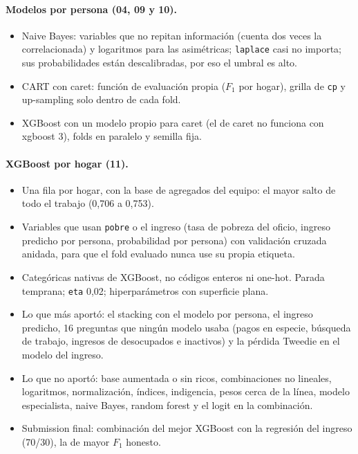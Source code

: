 \documentclass[12pt]{article}
\begin{document}
\paragraph{Modelos por persona (04, 09 y 10).}
\begin{itemize}
  \item Naive Bayes: variables que no repitan información (cuenta dos veces
    la correlacionada) y logaritmos para las asimétricas; \texttt{laplace}
    casi no importa; sus probabilidades están descalibradas, por eso el
    umbral es alto.
  \item CART con caret: función de evaluación propia ($F_1$ por hogar), grilla
    de \texttt{cp} y up-sampling solo dentro de cada fold.
  \item XGBoost con un modelo propio para caret (el de caret no funciona con
    xgboost 3), folds en paralelo y semilla fija.
\end{itemize}

\paragraph{XGBoost por hogar (11).}
\begin{itemize}
  \item Una fila por hogar, con la base de agregados del equipo: el mayor
    salto de todo el trabajo (0,706 a 0,753).
  \item Variables que usan \texttt{pobre} o el ingreso (tasa de pobreza del
    oficio, ingreso predicho por persona, probabilidad por persona) con
    validación cruzada anidada, para que el fold evaluado nunca use su propia
    etiqueta.
  \item Categóricas nativas de XGBoost, no códigos enteros ni one-hot.
    Parada temprana; \texttt{eta} 0,02; hiperparámetros con superficie plana.
  \item Lo que más aportó: el stacking con el modelo por persona, el ingreso
    predicho, 16 preguntas que ningún modelo usaba (pagos en especie,
    búsqueda de trabajo, ingresos de desocupados e inactivos) y la pérdida
    Tweedie en el modelo del ingreso.
  \item Lo que no aportó: base aumentada o sin ricos, combinaciones no
    lineales, logaritmos, normalización, índices, indigencia, pesos cerca de
    la línea, modelo especialista, naive Bayes, random forest y el logit en
    la combinación.
  \item Submission final: combinación del mejor XGBoost con la regresión del
    ingreso (70/30), la de mayor $F_1$ honesto.
\end{itemize}
\end{document}
